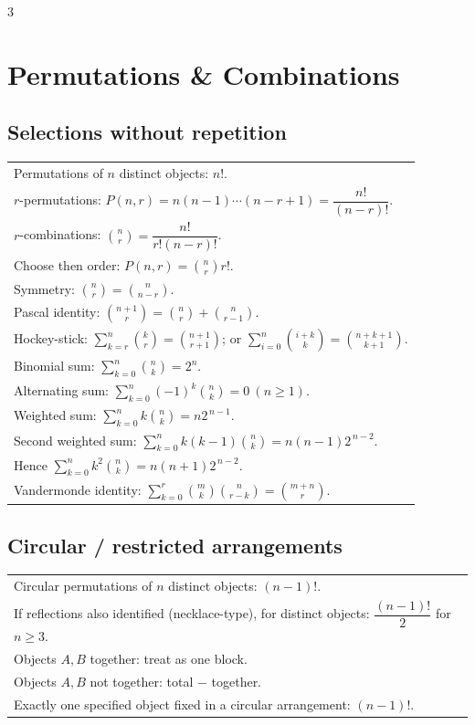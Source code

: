 \documentclass[10pt]{article}
\begin{document}
\begin{multicols*}{3}
\section*{Permutations \& Combinations}

\subsection*{Selections without repetition}
\vspace{-1pt}
\begin{tabular}{@{}p{}@{}}
Permutations of $n$ distinct objects: $n!$.\\
\vspace{-10pt}
$r$-permutations: $P(n,r)=n(n-1)\cdots(n-r+1)=\dfrac{n!}{(n-r)!}$.\\
\vspace{-10pt}
$r$-combinations: $\binom{n}{r}=\dfrac{n!}{r!(n-r)!}$.\\
Choose then order: $P(n,r)=\binom{n}{r}r!$.\\
Symmetry: $\binom{n}{r}=\binom{n}{n-r}$.\\
Pascal identity: $\binom{n+1}{r}=\binom{n}{r}+\binom{n}{r-1}$.\\
\vspace{-10pt}
Hockey-stick: $\sum_{k=r}^{n}\binom{k}{r}=\binom{n+1}{r+1}$; or $\displaystyle\sum_{i=0}^{n}\binom{i+k}{k}=\binom{n+k+1}{k+1}$.\\
\vspace{-10pt}
Binomial sum: $\sum_{k=0}^{n}\binom{n}{k}=2^n$.\\
Alternating sum: $\sum_{k=0}^{n}(-1)^k\binom{n}{k}=0\ (n\ge 1)$.\\
Weighted sum: $\sum_{k=0}^{n}k\binom{n}{k}=n2^{\,n-1}$.\\
Second weighted sum: $\sum_{k=0}^{n}k(k-1)\binom{n}{k}=n(n-1)2^{\,n-2}$.\\
Hence $\sum_{k=0}^{n}k^2\binom{n}{k}=n(n+1)2^{\,n-2}$.\\
Vandermonde identity: $\sum_{k=0}^{r}\binom{m}{k}\binom{n}{r-k}=\binom{m+n}{r}$.\\
\end{tabular}

\subsection*{Circular / restricted arrangements}
\vspace{-1pt}
\begin{tabular}{@{}p{}@{}}
Circular permutations of $n$ distinct objects: $(n-1)!$.\\
If reflections also identified (necklace-type), for distinct objects: $\dfrac{(n-1)!}{2}$ for $n\ge 3$.\\
Objects $A,B$ together: treat as one block.\\
Objects $A,B$ not together: total $-$ together.\\
Exactly one specified object fixed in a circular arrangement: $(n-1)!$.\\
\end{tabular}


\end{multicols*}
\end{document}
